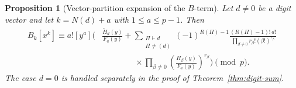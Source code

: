 \documentclass[11pt]{amsart}
\numberwithin{equation}{section}
\newtheorem{proposition}[proposition]{Proposition}
\begin{document}
\begin{proposition}[Vector-partition expansion of the $B$-term]\label{prop:vector-B}
Let $d\ne0$ be a digit vector and let $k=N(d)+a$ with $1\le a\le p-1$.  Then
\begin{equation}\label{eq:vector-B}
\begin{aligned}
B_k[x^k]\equiv a![y^a]\Biggl(
&\frac{\widetilde H_d(y)}{F_a(y)} +\sum_{\substack{\Pi\vdash d\\ \Pi\ne(d)}}
(-1)^{R(\Pi)-1}
\frac{(R(\Pi)-1)!\,d!}{\prod_{\beta\ne0}r_\beta!(\beta!)^{r_\beta}} \\
&\qquad\qquad\times \prod_{\beta\ne0}\left(\frac{H_\beta(y)}{F_a(y)}\right)^{r_\beta}
\Biggr)\pmod p.
\end{aligned}
\end{equation}
The case $d=0$ is handled separately in the proof of Theorem~\ref{thm:digit-sum}.
\end{proposition}
\end{document}
